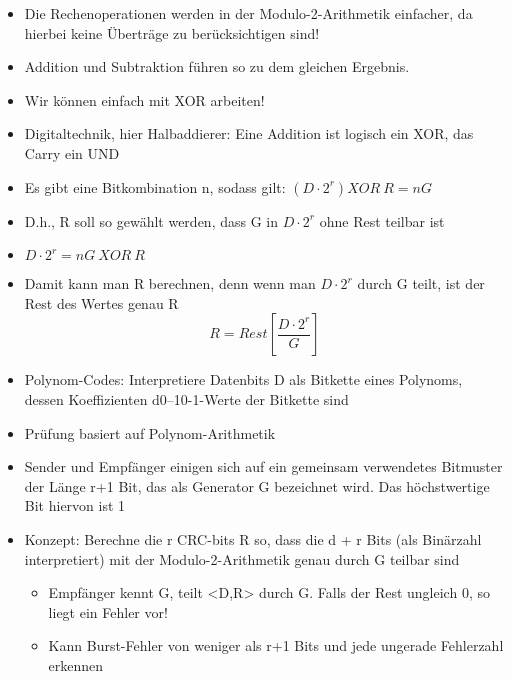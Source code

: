 \begin{itemize}
    \item Die Rechenoperationen werden in der Modulo-2-Arithmetik einfacher, da hierbei keine Überträge zu berücksichtigen sind!
    \item Addition und Subtraktion führen so zu dem gleichen Ergebnis.
    \item Wir können einfach mit XOR arbeiten!
    \item Digitaltechnik, hier Halbaddierer: Eine Addition ist logisch ein XOR, das Carry ein UND
    \item Es gibt eine Bitkombination n, sodass gilt: $(D \cdot 2^r) XOR \ R = n G$
    \item D.h., R soll so gewählt werden, dass G in $D \cdot 2^r$ ohne Rest teilbar ist
    \item $D \cdot 2^r = nG \ XOR \ R$
    \item Damit kann man R berechnen, denn wenn man $D \cdot 2^r$ durch G teilt, ist der Rest des Wertes genau R
    \[R = Rest\left[\frac{D \cdot 2^r}{G}\right]\]
\end{itemize}

\begin{itemize}
    \item Polynom-Codes: Interpretiere Datenbits D als Bitkette eines Polynoms, dessen Koeffizienten d0--10-1-Werte der Bitkette sind
    \item Prüfung basiert auf Polynom-Arithmetik
    \item Sender und Empfänger einigen sich auf ein gemeinsam verwendetes Bitmuster der Länge r+1 Bit, das als Generator G bezeichnet wird. Das höchstwertige Bit hiervon ist 1
    \item Konzept: Berechne die r CRC-bits R so, dass die d + r Bits (als Binärzahl interpretiert) mit der Modulo-2-Arithmetik genau durch G teilbar sind
    \begin{itemize}
        \item Empfänger kennt G, teilt <D,R> durch G. Falls der Rest ungleich 0, so liegt ein Fehler vor!
        \item Kann Burst-Fehler von weniger als r+1 Bits und jede ungerade Fehlerzahl erkennen
    \end{itemize}
\end{itemize}
